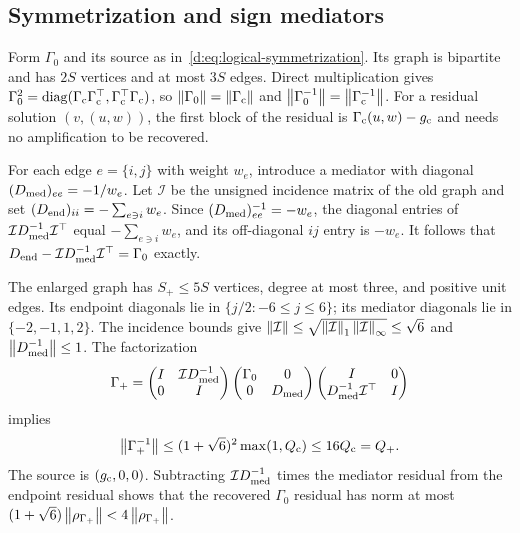 \subsection{Symmetrization and sign mediators}

Form $\Gamma_0$ and its source as in~\eqref{d:eq:logical-symmetrization}.
Its graph is bipartite and has $2S$ vertices and at most $3S$ edges.
Direct multiplication gives
$\Gamma_0^2=\operatorname{diag}(\Gamma_{\rm c}\Gamma_{\rm c}^\top,\Gamma_{\rm c}^\top\Gamma_{\rm c})$, so
$\left\lVert \Gamma_0\right\rVert=\left\lVert \Gamma_{\rm c}\right\rVert$ and
$\left\lVert \Gamma_0^{-1}\right\rVert=\left\lVert \Gamma_{\rm c}^{-1}\right\rVert$.
For a residual solution $(v,(u,w))$, the first block of the residual
is $\Gamma_{\rm c}(u,w)-g_{\rm c}$ and needs no amplification to be recovered.

For each edge $e=\{i,j\}$ with weight $w_e$, introduce a mediator with
diagonal $(D_{\rm med})_{ee}=-1/w_e$. Let $\mathcal I$ be the unsigned incidence matrix of
the old graph and set $(D_{\rm end})_{ii}=-\sum_{e\ni i}w_e$. Since
$(D_{\rm med})_{ee}^{-1}=-w_e$, the diagonal entries of $\mathcal ID_{\rm med}^{-1}\mathcal I^\top$ equal
$-\sum_{e\ni i}w_e$, and its off-diagonal $ij$ entry is $-w_e$.
It follows that $D_{\rm end}-\mathcal ID_{\rm med}^{-1}\mathcal I^\top=\Gamma_0$ exactly.

The enlarged graph has $S_+\le5S$ vertices, degree at most three, and
positive unit edges. Its endpoint diagonals lie in
$\{j/2:-6\le j\le6\}$; its mediator diagonals lie in
$\{-2,-1,1,2\}$. The incidence bounds give
$\left\lVert \mathcal I\right\rVert\le\sqrt{\left\lVert \mathcal I\right\rVert_1\left\lVert \mathcal I\right\rVert_\infty}\le\sqrt6$ and
$\left\lVert D_{\rm med}^{-1}\right\rVert\le1$.
The factorization
\begin{equation}
 \Gamma_+=
 \begin{pmatrix}I&\mathcal ID_{\rm med}^{-1}\\0&I\end{pmatrix}
 \begin{pmatrix}\Gamma_0&0\\0&D_{\rm med}\end{pmatrix}
 \begin{pmatrix}I&0\\D_{\rm med}^{-1}\mathcal I^\top&I\end{pmatrix}
\end{equation}
implies
\begin{equation}
 \left\lVert \Gamma_+^{-1}\right\rVert
 \le(1+\sqrt6)^2\max(1,Q_{\rm c})\le16Q_{\rm c}=Q_+.
\end{equation}
The source is $(g_{\rm c},0,0)$. Subtracting $\mathcal ID_{\rm med}^{-1}$ times the mediator
residual from the endpoint residual shows that the recovered $\Gamma_0$
residual has norm at most
$(1+\sqrt6)\left\lVert \rho_{\Gamma_+}\right\rVert<4\left\lVert \rho_{\Gamma_+}\right\rVert$.

